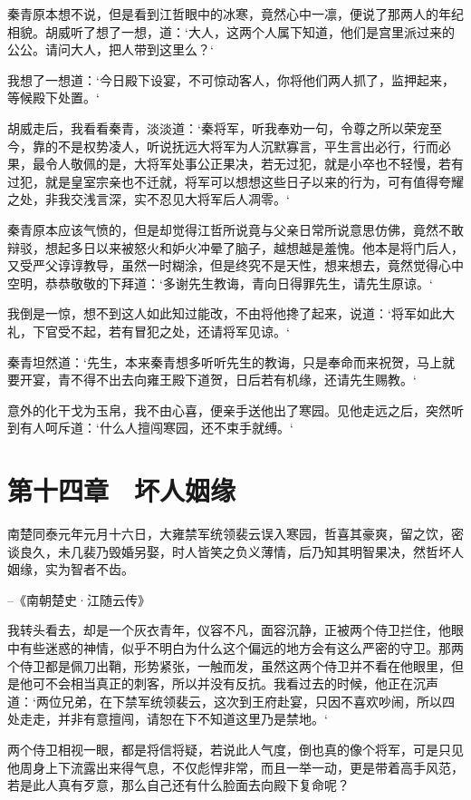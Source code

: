 秦青原本想不说，但是看到江哲眼中的冰寒，竟然心中一凛，便说了那两人的年纪相貌。胡威听了想了一想，道：‘大人，这两个人属下知道，他们是宫里派过来的公公。请问大人，把人带到这里么？‘

我想了一想道：‘今日殿下设宴，不可惊动客人，你将他们两人抓了，监押起来，等候殿下处置。‘

胡威走后，我看看秦青，淡淡道：‘秦将军，听我奉劝一句，令尊之所以荣宠至今，靠的不是权势凌人，听说抚远大将军为人沉默寡言，平生言出必行，行而必果，最令人敬佩的是，大将军处事公正果决，若无过犯，就是小卒也不轻慢，若有过犯，就是皇室宗亲也不迁就，将军可以想想这些日子以来的行为，可有值得夸耀之处，非我交浅言深，实不忍见大将军后人凋零。‘

秦青原本应该气愤的，但是却觉得江哲所说竟与父亲日常所说意思仿佛，竟然不敢辩驳，想起多日以来被怒火和妒火冲晕了脑子，越想越是羞愧。他本是将门后人，又受严父谆谆教导，虽然一时糊涂，但是终究不是天性，想来想去，竟然觉得心中空明，恭恭敬敬的下拜道：‘多谢先生教诲，青向日得罪先生，请先生原谅。‘

我倒是一惊，想不到这人如此知过能改，不由将他搀了起来，说道：‘将军如此大礼，下官受不起，若有冒犯之处，还请将军见谅。‘

秦青坦然道：‘先生，本来秦青想多听听先生的教诲，只是奉命而来祝贺，马上就要开宴，青不得不出去向雍王殿下道贺，日后若有机缘，还请先生赐教。‘

意外的化干戈为玉帛，我不由心喜，便亲手送他出了寒园。见他走远之后，突然听到有人呵斥道：‘什么人擅闯寒园，还不束手就缚。‘

\chapter{第十四章　坏人姻缘}

南楚同泰元年元月十六日，大雍禁军统领裴云误入寒园，哲喜其豪爽，留之饮，密谈良久，未几裴乃毁婚另娶，时人皆笑之负义薄情，后乃知其明智果决，然哲坏人姻缘，实为智者不齿。

--《南朝楚史·江随云传》

我转头看去，却是一个灰衣青年，仪容不凡，面容沉静，正被两个侍卫拦住，他眼中有些迷惑的神情，似乎不明白为什么这个偏远的地方会有这么严密的守卫。那两个侍卫都是佩刀出鞘，形势紧张，一触而发，虽然这两个侍卫并不看在他眼里，但是他可不会相当真正的刺客，所以并没有反抗。我看过去的时候，他正在沉声道：‘两位兄弟，在下禁军统领裴云，这次到王府赴宴，只因不喜欢吵闹，所以四处走走，并非有意擅闯，请恕在下不知道这里乃是禁地。‘

两个侍卫相视一眼，都是将信将疑，若说此人气度，倒也真的像个将军，可是只见他周身上下流露出来得气息，不仅彪悍非常，而且一举一动，更是带着高手风范，若是此人真有歹意，那么自己还有什么脸面去向殿下复命呢？

